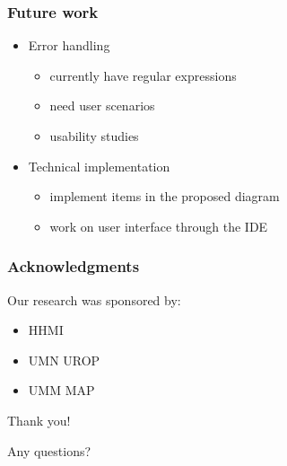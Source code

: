 \documentclass{beamer}
\begin{document}
\begin{frame}
\frametitle{Future work}
	\begin{itemize}
	\item Error handling	
	\begin{itemize}
		\item currently have regular expressions
		\item need user scenarios
		\item usability studies
	\end{itemize}
	\item Technical implementation
	\begin{itemize}
		\item implement items in the proposed diagram
		\item work on user interface through the IDE
	\end{itemize}
	\end{itemize}
\end{frame}

\begin{frame}

\frametitle{Acknowledgments}
	Our research was sponsored by:
	\begin{itemize}
	\item HHMI
	\item UMN UROP
	\item UMM MAP
	\end{itemize}
	
	
	{\centering
	\noindent
	Thank you! \par
	Any questions? \par
	}
\end{frame}
\end{document}
